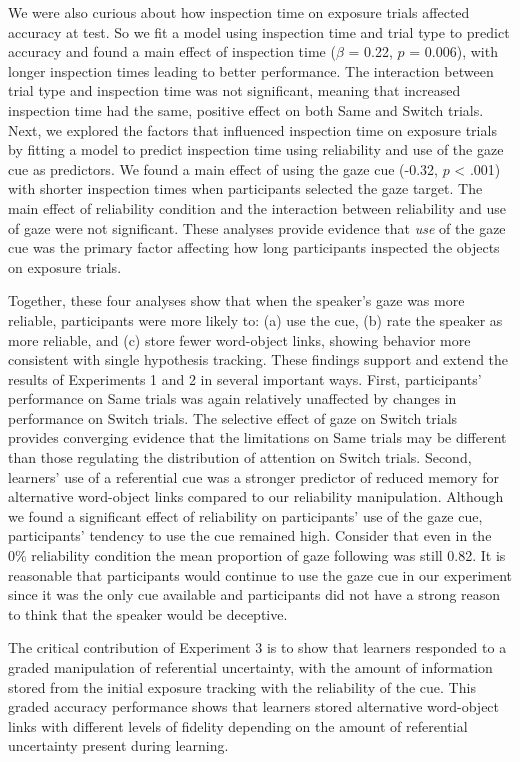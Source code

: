 \documentclass[authoryear, review]{elsarticle}
\begin{document}
We were also curious about how inspection time on exposure trials
affected accuracy at test. So we fit a model using inspection time and
trial type to predict accuracy and found a main effect of inspection
time (\(\beta\) = 0.22, \(p\) = 0.006), with longer inspection times
leading to better performance. The interaction between trial type and
inspection time was not significant, meaning that increased inspection
time had the same, positive effect on both Same and Switch trials. Next,
we explored the factors that influenced inspection time on exposure
trials by fitting a model to predict inspection time using reliability
and use of the gaze cue as predictors. We found a main effect of using
the gaze cue (-0.32, \(p\) \textless{} .001) with shorter inspection
times when participants selected the gaze target. The main effect of
reliability condition and the interaction between reliability and use of
gaze were not significant. These analyses provide evidence that
\emph{use} of the gaze cue was the primary factor affecting how long
participants inspected the objects on exposure trials.

Together, these four analyses show that when the speaker's gaze was more
reliable, participants were more likely to: (a) use the cue, (b) rate
the speaker as more reliable, and (c) store fewer word-object links,
showing behavior more consistent with single hypothesis tracking. These
findings support and extend the results of Experiments 1 and 2 in
several important ways. First, participants' performance on Same trials
was again relatively unaffected by changes in performance on Switch
trials. The selective effect of gaze on Switch trials provides
converging evidence that the limitations on Same trials may be different
than those regulating the distribution of attention on Switch trials.
Second, learners' use of a referential cue was a stronger predictor of
reduced memory for alternative word-object links compared to our
reliability manipulation. Although we found a significant effect of
reliability on participants' use of the gaze cue, participants' tendency
to use the cue remained high. Consider that even in the 0\% reliability
condition the mean proportion of gaze following was still 0.82. It is
reasonable that participants would continue to use the gaze cue in our
experiment since it was the only cue available and participants did not
have a strong reason to think that the speaker would be deceptive.

The critical contribution of Experiment 3 is to show that learners
responded to a graded manipulation of referential uncertainty, with the
amount of information stored from the initial exposure tracking with the
reliability of the cue. This graded accuracy performance shows that
learners stored alternative word-object links with different levels of
fidelity depending on the amount of referential uncertainty present
during learning.
\end{document}

